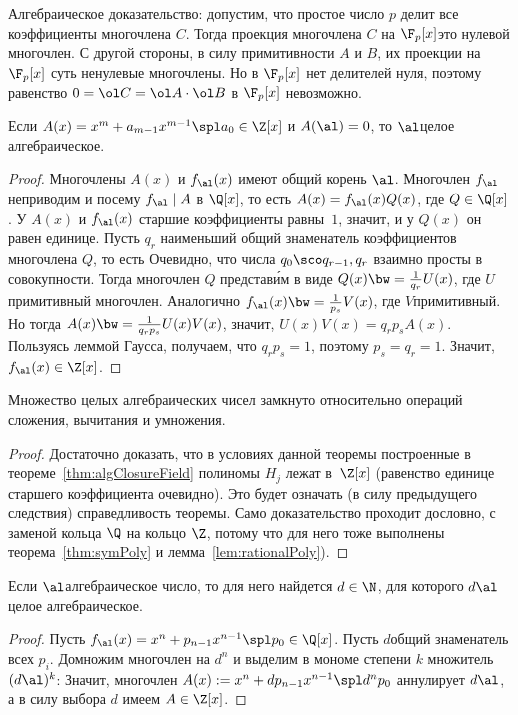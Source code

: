 \documentclass[a4paper]{article}
\begin{document}
\begin{petit}
Алгебраическое доказательство: допустим, что простое число $p$ делит все коэффициенты многочлена $C$.
Тогда проекция многочлена $C$ на $\F_p[x]$\т это нулевой многочлен.
С другой стороны, в силу примитивности $A$ и $B$, их проекции на $\F_p[x]$ суть  ненулевые многочлены.
Но в $\F_p[x]$ нет делителей нуля, поэтому равенство $0 = \ol C = \ol A\cdot \ol B$ в $\F_p[x]$ невозможно.
\end{petit}


\begin{imp}
Если $A(x)=x^m+a_{m-1}x^{m-1}\spl a_0\in\Z[x]$ и $A(\al)=0$, то $\al$\т  целое
алгебраическое.
\end{imp}
\begin{proof}
Многочлены $A(x)$ и $f_{\al}(x)$ имеют общий корень $\al$. Многочлен $f_{\al}$ неприводим и посему
$f_{\al}\mid A$ в $\Q[x]$, то есть $A(x)=f_{\al}(x)Q(x)$, где $Q\in \Q[x]$. У
$A(x)$ и $f_{\al}(x)$ старшие коэффициенты равны~$1$, значит, и у $Q(x)$ он равен единице. Пусть $q_r$\т
наименьший общий знаменатель коэффициентов многочлена $Q$, то есть
Очевидно, что числа $q_0\sco q_{r-1},q_r$ взаимно просты в совокупности.
Тогда многочлен $Q$ представ\'им в виде $Q(x)\bw=\frac1{q_r} U(x)$, где $U$\т примитивный многочлен.
Аналогично $f_{\al}(x)\bw=\frac1{p_s} V(x)$, где $V$\т  примитивный. Но
тогда $A(x)\bw=\frac1{q_rp_s}U(x)V(x)$, значит, $U(x)V(x)=q_r p_s A(x)$. Пользуясь леммой Гаусса,
получаем, что $q_r p_s=1$, поэтому $p_s=q_r=1$. Значит, $f_{\al}(x)\in\Z[x]$.
\end{proof}

\begin{theorem}
Множество целых алгебраических чисел замкнуто относительно операций сложения, вычитания и умножения.
\end{theorem}
\begin{proof}
Достаточно доказать, что в условиях данной теоремы построенные в теореме~\ref{thm:algClosureField} полиномы $H_j$ лежат в~$\Z[x]$
(равенство единице старшего коэффициента очевидно). Это будет означать (в силу предыдущего следствия)
справедливость теоремы. Само доказательство проходит дословно, с заменой кольца $\Q$ на кольцо $\Z$,
потому что для него тоже выполнены теорема~\ref{thm:symPoly} и лемма~\ref{lem:rationalPoly}).
\end{proof}

\begin{lemma}
Если $\al$\т алгебраическое число, то для него найдется $d\in\N$, для которого $d\al$\т целое
алгебраическое.
\end{lemma}
\begin{proof}
Пусть $f_{\al}(x)=x^n+p_{n-1}x^{n-1}\spl p_0\in\Q[x]$. Пусть $d$\т  общий знаменатель
всех $p_i$. Домножим многочлен на $d^n$ и выделим в мономе степени $k$ множитель $(d\al)^k$:
Значит, многочлен $A(x):=x^n+dp_{n-1}x^{n-1}\spl d^np_0$ аннулирует $d\al$,
а в силу выбора $d$ имеем $A\in\Z[x]$.
\end{proof}
\end{document}
